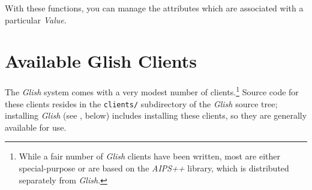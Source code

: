 With these functions, you can manage the attributes which are
associated with a particular {\em Value}.


\section{Available Glish Clients}
\label{available-clients}

The {\em Glish} system comes with a very modest number of clients.\footnote{While
a fair number of {\em Glish} clients have been written, most are either 
special-purpose or are based on the {\em AIPS++} library, which is distributed
separately from {\em Glish}.}  Source code for these clients resides in
the {\tt clients/} subdirectory of the {\em Glish} source tree; installing
{\em Glish} (see , below) includes installing these clients,
so they are generally available for use.

